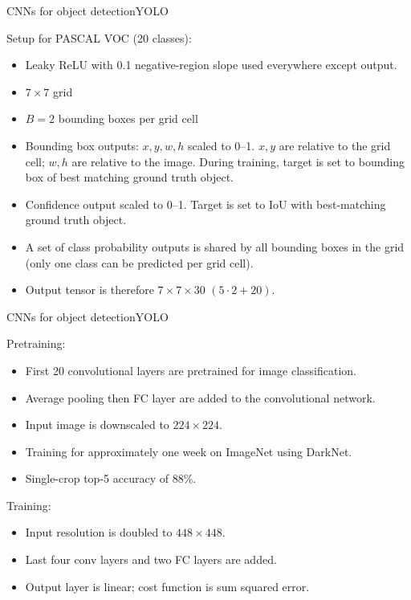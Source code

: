 \documentclass[aspectratio=169]{beamer}
\begin{document}
\begin{frame}{CNNs for object detection}{YOLO}

  Setup for PASCAL VOC (20 classes):
  \begin{itemize}
    \item Leaky ReLU with 0.1 negative-region slope used everywhere except
      output.
    \item $7\times7$ grid
    \item $B=2$ bounding boxes per grid cell
    \item Bounding box outputs: $x,y,w,h$ scaled to 0--1. $x,y$ are
      relative to the grid cell; $w,h$ are relative to the
      image. During training, target is set to bounding box of best
      matching ground truth object.
    \item Confidence output scaled to 0--1. Target is set to IoU with
      best-matching ground truth object.
    \item A set of class probability outputs is \alert{shared} by all
      bounding boxes in the grid (only one class can be predicted per
      grid cell).
    \item Output tensor is therefore $7\times 7\times 30$ $(5\cdot 2 + 20)$.
  \end{itemize}
 
\end{frame}


\begin{frame}{CNNs for object detection}{YOLO}

  \alert{Pretraining}:
  \begin{itemize}
  \item First 20 convolutional layers are pretrained for image classification.
  \item Average pooling then FC layer are added to the convolutional network.
  \item Input image is downscaled to $224\times 224$.
  \item Training for approximately one week on ImageNet using DarkNet.
  \item Single-crop top-5 accuracy of 88\%.
  \end{itemize}

  \medskip

  \alert{Training}:
  \begin{itemize}
  \item Input resolution is doubled to $448\times 448$.
  \item Last four conv layers and two FC layers are added.
  \item Output layer is linear; cost function is sum squared error.
  \end{itemize}
  
\end{frame}
\end{document}
